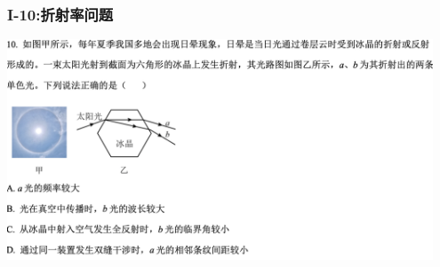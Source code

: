 \documentclass{article}
\begin{document}
\vspace{2em}

\subsubsection{I-10:折射率问题}
\includegraphics[width=0.95\textwidth,keepaspectratio]{./pictures/1.4-4.png}
\end{document}
